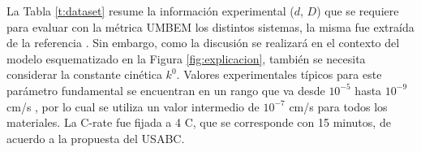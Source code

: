 La Tabla \ref{t:dataset} resume la información experimental ($d$, $D$) que se 
requiere para evaluar con la métrica UMBEM los distintos sistemas, la misma fue 
extraída de la referencia \cite{xia2022}. Sin embargo, como la discusión se 
realizará en el contexto del modelo esquematizado en la Figura 
\ref{fig:explicacion}, también se necesita considerar la constante cinética $k^0$.
Valores experimentales típicos para este parámetro fundamental se encuentran en 
un rango que va desde $10^{-5}$ hasta $10^{-9}$ cm/s \cite{gavilan2020kinetic}, 
por lo cual se utiliza un valor intermedio de $10^{-7}$ cm/s para todos los 
materiales. La C-rate fue fijada a 4 C, que se corresponde con 15 minutos, 
de acuerdo a la propuesta del USABC. 
\begin{table}[h!]
    \centering
    \caption{Datos experimentales de distintos sistemas requeridos para evaluar 
    la métrica UMBEM.}
    \setlength\extrarowheight{2pt}
\end{table}
